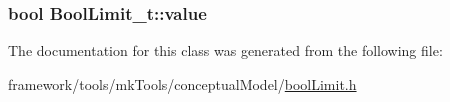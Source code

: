 \subsubsection[{\texorpdfstring{value}{value}}]{\setlength{\rightskip}{0pt plus 5cm}bool Bool\+Limit\+\_\+t\+::value\hspace{0.3cm}{\ttfamily [protected]}}\hypertarget{class_bool_limit__t_a2f8e5147d30c767483d068b4d4964edc}{}\label{class_bool_limit__t_a2f8e5147d30c767483d068b4d4964edc}


The documentation for this class was generated from the following file\+:\begin{DoxyCompactItemize}
\item 
framework/tools/mk\+Tools/conceptual\+Model/\hyperlink{bool_limit_8h}{bool\+Limit.\+h}\end{DoxyCompactItemize}
